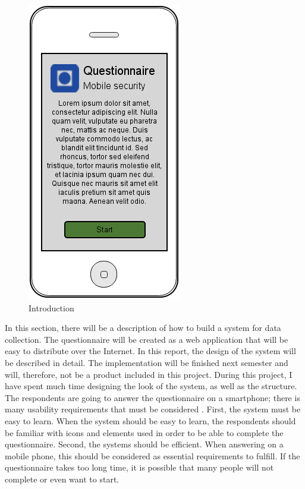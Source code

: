     
    \begin{figure}
      \centering
      \vspace{-5pt}
      \includegraphics[scale=0.40]{screens/v3/mobile/mobile1-1.png}
      \caption{Introduction}
      \label{fig:wireframe1}
    \end{figure}
    
  In this section, there will be a description of how to build a system for data collection. The questionnaire will be created as a web application that will be easy to distribute over the Internet. In this report, the design of the system will be described in detail. The implementation will be finished next semester and will, therefore, not be a product included in this project. During this project, I have spent much time designing the look of the system, as well as the structure. The respondents are going to answer the questionnaire on a smartphone; there is many usability requirements that must be considered \cite{ISO9241}. First, the system must be easy to learn. When the system should be easy to learn, the respondents should be familiar with icons and elements used in order to be able to complete the questionnaire. Second, the systems should be efficient. When answering on a mobile phone, this should be considered as essential requirements to fulfill. If the questionnaire takes too long time, it is possible that many people will not complete or even want to start.

